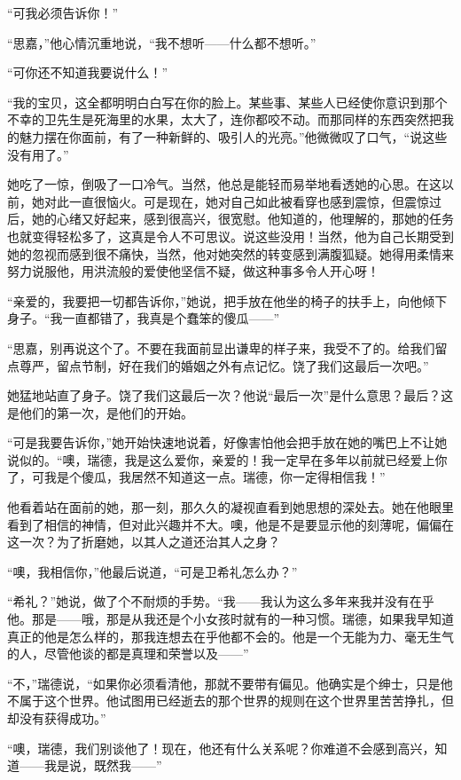 \par “可我必须告诉你！”
\par “思嘉，”他心情沉重地说，“我不想听——什么都不想听。”
\par “可你还不知道我要说什么！”
\par “我的宝贝，这全都明明白白写在你的脸上。某些事、某些人已经使你意识到那个不幸的卫先生是死海里的水果，太大了，连你都咬不动。而那同样的东西突然把我的魅力摆在你面前，有了一种新鲜的、吸引人的光亮。”他微微叹了口气，“说这些没有用了。”
\par 她吃了一惊，倒吸了一口冷气。当然，他总是能轻而易举地看透她的心思。在这以前，她对此一直很恼火。可是现在，她对自己如此被看穿也感到震惊，但震惊过后，她的心绪又好起来，感到很高兴，很宽慰。他知道的，他理解的，那她的任务也就变得轻松多了，这真是令人不可思议。说这些没用！当然，他为自己长期受到她的忽视而感到很不痛快，当然，他对她突然的转变感到满腹狐疑。她得用柔情来努力说服他，用洪流般的爱使他坚信不疑，做这种事多令人开心呀！
\par “亲爱的，我要把一切都告诉你，”她说，把手放在他坐的椅子的扶手上，向他倾下身子。“我一直都错了，我真是个蠢笨的傻瓜——”
\par “思嘉，别再说这个了。不要在我面前显出谦卑的样子来，我受不了的。给我们留点尊严，留点节制，好在我们的婚姻之外有点记忆。饶了我们这最后一次吧。”
\par 她猛地站直了身子。饶了我们这最后一次？他说“最后一次”是什么意思？最后？这是他们的第一次，是他们的开始。
\par “可是我要告诉你，”她开始快速地说着，好像害怕他会把手放在她的嘴巴上不让她说似的。“噢，瑞德，我是这么爱你，亲爱的！我一定早在多年以前就已经爱上你了，可我是个傻瓜，我居然不知道这一点。瑞德，你一定得相信我！”
\par 他看着站在面前的她，那一刻，那久久的凝视直看到她思想的深处去。她在他眼里看到了相信的神情，但对此兴趣并不大。噢，他是不是要显示他的刻薄呢，偏偏在这一次？为了折磨她，以其人之道还治其人之身？
\par “噢，我相信你，”他最后说道，“可是卫希礼怎么办？”
\par “希礼？”她说，做了个不耐烦的手势。“我——我认为这么多年来我并没有在乎他。那是——哦，那是从我还是个小女孩时就有的一种习惯。瑞德，如果我早知道真正的他是怎么样的，那我连想去在乎他都不会的。他是一个无能为力、毫无生气的人，尽管他谈的都是真理和荣誉以及——”
\par “不，”瑞德说，“如果你必须看清他，那就不要带有偏见。他确实是个绅士，只是他不属于这个世界。他试图用已经逝去的那个世界的规则在这个世界里苦苦挣扎，但却没有获得成功。”
\par “噢，瑞德，我们别谈他了！现在，他还有什么关系呢？你难道不会感到高兴，知道——我是说，既然我——”
